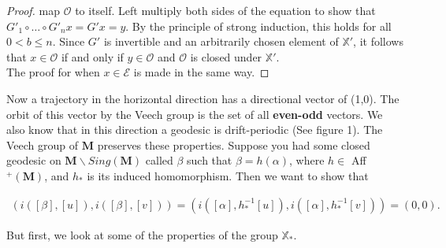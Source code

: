 \documentclass[]{article}
\begin{document}
\begin{lem}
\begin{proof}
map $\mathcal{O}$ to itself. Left multiply both sides of the equation to show that $G'_1\circ\dots\circ G'_n x = G' x = y$. By the principle of strong induction, this holds for all $0<b\leq n$. Since $G'$ is invertible and an arbitrarily chosen element of $\mathbb{X}'$, it follows that $x\in\mathcal{O}$ if and only if $y\in\mathcal{O}$ and $\mathcal{O}$ is closed under $\mathbb{X}'$.\\
The proof for when $x\in\mathcal{E}$ is made in the same way.
\end{proof}
\end{lem}


Now a trajectory in the horizontal direction has a directional vector of (1,0). The orbit of this vector by the Veech group is the set of all \textbf{even-odd} vectors. We also know that in this direction a geodesic is drift-periodic (See figure 1). The Veech group of $\mathbf{M}$ preserves these properties. Suppose you had some closed geodesic on $\mathbf{M}\backslash Sing(\mathbf{M})$ called $\beta$ such that $\beta=h(\alpha)$, where $h\in$  Aff$^+(\mathbf{M})$, and $h_*$ is its induced homomorphism. Then we want to show that

\begin{align*}
(i([\beta],[u]), i([\beta],[v]))=(i([\alpha],h^{-1}_*[u]), i([\alpha],h^{-1}_*[v])) = (0,0).
\end{align*}

But first, we look at some of the properties of the group $\mathbb{X}_*$.
\end{document}
